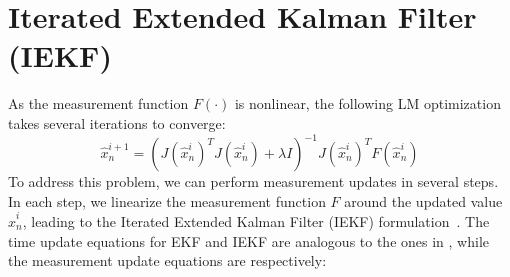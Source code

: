 \clearpage
\section{Iterated Extended Kalman Filter (IEKF)}
\label{app:iekf}
As the measurement function $F(\cdot)$ is nonlinear, the following LM optimization takes several iterations to converge: 
\begin{equation}
\hat{x}_n^{i + 1} = (J(\hat{x}_n^i) ^T J(\hat{x}_n^i) + \lambda I)^{-1} J(\hat{x}_n^i)^T F(\hat{x}_n^i)   
\end{equation}
To address this problem, we can perform measurement updates in several steps. In each step, we linearize the measurement function $F$ around the updated value $\hat{x}_n^i$, leading to the Iterated Extended Kalman Filter (IEKF) formulation~\cite{havlik2015performance}. The time update equations for EKF and IEKF are analogous to the ones in , while the measurement update equations are respectively:
\begin{table}[!h] 
\centering
{}
\caption{EKF vs. IEKF measurement update equations \label{tab:ekf-iekf}}
\end{table}

